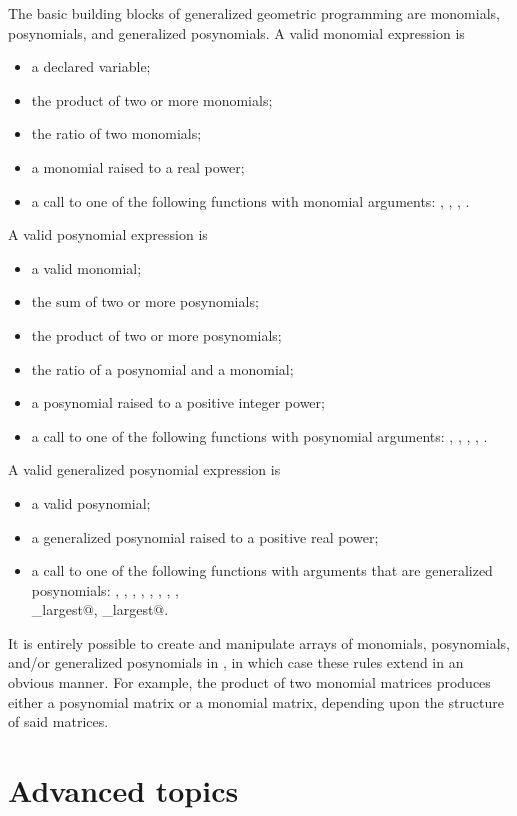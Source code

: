 \documentclass[12pt]{article}
\begin{document}
The basic building blocks of generalized geometric programming are
monomials, posynomials, and generalized posynomials. A valid monomial expression is
\begin{itemize}
\item a declared variable;
\item the product of two or more monomials;
\item the ratio of two monomials;
\item a monomial raised to a real power;
\item a call to one of the following functions with monomial arguments:
      \verb@prod@, \verb@cumprod@, \verb@geomean@, \verb@sqrt@.
\end{itemize}
A valid posynomial expression is
\begin{itemize}
\item a valid monomial;
\item the sum of two or more posynomials;
\item the product of two or more posynomials;
\item the ratio of a posynomial and a monomial;
\item a posynomial raised to a positive integer power;
\item a call to one of the following functions with posynomial arguments:
      \verb@sum@, \verb@cumsum@, \verb@mean@, \verb@prod@, \verb@cumprod@.
\end{itemize}
A valid generalized posynomial expression is
\begin{itemize}
\item a valid posynomial;
\item a generalized posynomial raised to a positive real power;
\item a call to one of the following functions with arguments
      that are generalized posynomials: \verb@sum@, \verb@cumsum@,
      \verb@mean@, \verb@prod@, \verb@cumprod@, \verb@geomean@,
      \verb@sqrt@, \verb@norm@, \\ \verb@sum_largest@, \verb@norm_largest@.
\end{itemize}
It is entirely possible to create and manipulate arrays of monomials,
posynomials, and/or generalized posynomials in \cvx, in which case these
rules extend in an obvious manner. For example, the product of two
monomial matrices produces either a posynomial matrix or a monomial 
matrix, depending upon the structure of said matrices.

\section{Advanced topics}
\end{document}
